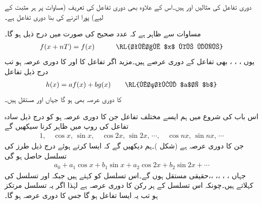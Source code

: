 دوری تفاعل کی مثالیں  اور  ہیں۔اس کے علاوہ  بھی دوری تفاعل کی تعریف (مساوات  پر ہر مثبت  کے لیے) پورا اترنے کی بنا  دوری تفاعل ہے۔

مساوات  سے ظاہر ہے کہ عدد صحیح  کی صورت میں درج ذیل ہو گا۔
\begin{align*}
f(x+nT)=f(x)\quad \quad \quad \text{\RL{تمام $x$ کے لیے}}
\end{align*}
یوں ، ، ،  بھی تفاعل  کے دوری عرصے ہیں۔مزید اگر تفاعل  کا اور  کا دوری عرصہ  ہو تب درج ذیل تفاعل
\begin{align*}
h(x)=af(x)+bg(x)\quad \quad \text{\RL{مستقل $a$، $b$}}
\end{align*}
 کا دوری عرصہ بھی  ہو گا جہاں  اور  مستقل ہیں۔

اس باب کی شروع میں ہم ایسے مختلف تفاعل جن کا دوری عرصہ  ہو کو درج ذیل سادہ تفاعل کی  روپ میں ظاہر کرنا سیکھیں گے
\begin{align*}
1,\quad \cos x,\, \sin x,\quad \cos 2x,\, \sin 2x,\,\cdots, \quad \cos nx,\, \sin nx,\,\cdots
\end{align*}
جن کا دوری عرصہ  ہے (شکل )۔ہم دیکھیں گے کہ  ایسا کرتے ہوئے درج ذیل طرز کی تسلسل حاصل ہو گی
\begin{align}\label{مساوات_فوریئر_دوری_تعریف_ب}
a_0+a_1\cos x+b_1\sin x+a_2\cos 2x+b_2\sin 2x+\cdots
\end{align}
جہاں ، ، ،، ،، حقیقی مستقل ہوں گے۔اس تسلسل کو  کہتے ہیں جبکہ  اور  تسلسل کی  کہلاتے ہیں۔چونکہ اس تسلسل کے ہر رکن کا دوری عرصہ  ہے لہٰذا اگر یہ تسلسل مرتکز ہو تب یہ ایسا تفاعل ہو گا جس کا دوری عرصہ  ہو گا۔
 
